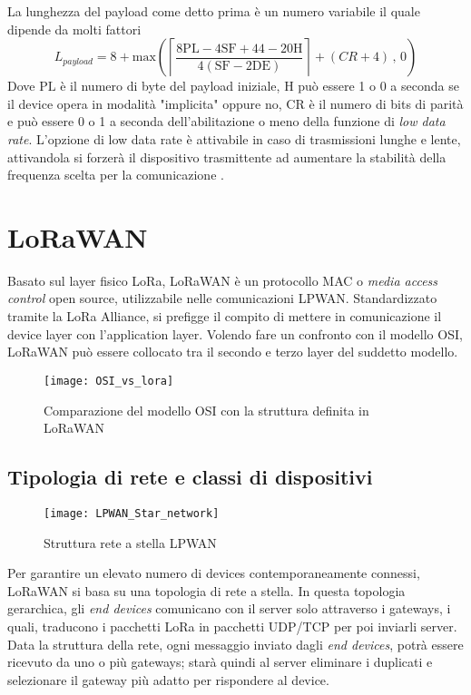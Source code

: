 La lunghezza del payload come detto prima è un numero variabile il quale dipende
da molti fattori 
\begin{equation}
        L_{payload} = 8+
        \text{max}\left(\left\lceil\frac{8\text{PL}-4\text{SF}+44-20\text{H}}{4(\text{SF}-2\text{DE})}
        \right\rceil+(CR+4)\, , \, 0 \right)
\end{equation}
Dove $\text{PL}$ è il numero di byte del payload iniziale, $\text{H}$ può essere
1 o 0 a seconda se il device opera in modalità "implicita" oppure no,
$\text{CR}$ è il numero di bits di parità e  può essere 0 o 1 a seconda
dell'abilitazione o meno della funzione di \emph{low data rate}.
L'opzione di low data rate è attivabile in caso di trasmissioni lunghe e lente,
attivandola si forzerà il dispositivo trasmittente ad aumentare la stabilità
della frequenza scelta per la comunicazione .

\section{LoRaWAN}

Basato sul layer fisico LoRa, LoRaWAN è un protocollo
MAC o \emph{media access control} open source, utilizzabile nelle comunicazioni
LPWAN. 
Standardizzato tramite la LoRa Alliance, si prefigge il compito di mettere in
comunicazione il device layer con l'application layer.
Volendo fare un confronto con il modello OSI, LoRaWAN può essere collocato tra il
secondo e terzo layer del suddetto modello. 

\begin{figure}[h]
\centering 
\texttt{[image: OSI\_vs\_lora]}
\caption{Comparazione del modello OSI con la struttura definita in LoRaWAN}
\label{}
\end{figure}

\subsection{Tipologia di rete e classi di dispositivi}
\begin{figure}[h]
\centering 
\texttt{[image: LPWAN\_Star\_network]}
\caption{Struttura rete a stella LPWAN}
\end{figure}
Per garantire un elevato numero di devices contemporaneamente connessi, LoRaWAN
si basa su una topologia di rete a stella.
In questa topologia gerarchica, gli \emph{end devices} comunicano con il server
solo attraverso i gateways, i quali, traducono i pacchetti LoRa in pacchetti
UDP/TCP per poi inviarli server.
Data la struttura della rete,  ogni messaggio inviato dagli \emph{end devices}, potrà essere ricevuto da uno o più
gateways; starà quindi al server eliminare i duplicati e selezionare il gateway
più adatto per rispondere al device.


